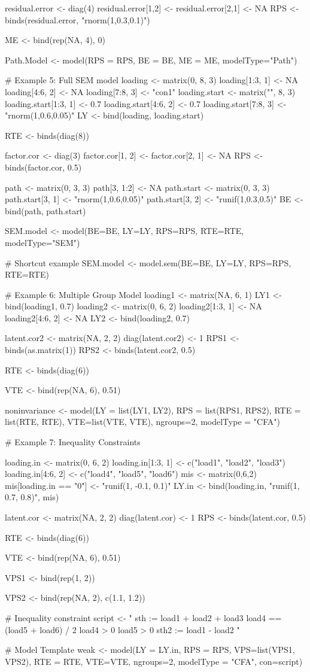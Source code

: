 \documentclass[a4paper]{book}
\begin{document}
\begin{Examples}
\begin{ExampleCode}
residual.error <- diag(4)
residual.error[1,2] <- residual.error[2,1] <- NA
RPS <- binds(residual.error, "rnorm(1,0.3,0.1)")

ME <- bind(rep(NA, 4), 0)

Path.Model <- model(RPS = RPS, BE = BE, ME = ME, modelType="Path")

# Example 5: Full SEM model 
loading <- matrix(0, 8, 3)
loading[1:3, 1] <- NA
loading[4:6, 2] <- NA
loading[7:8, 3] <- "con1"
loading.start <- matrix("", 8, 3)
loading.start[1:3, 1] <- 0.7
loading.start[4:6, 2] <- 0.7
loading.start[7:8, 3] <- "rnorm(1,0.6,0.05)"
LY <- bind(loading, loading.start)

RTE <- binds(diag(8))

factor.cor <- diag(3)
factor.cor[1, 2] <- factor.cor[2, 1] <- NA
RPS <- binds(factor.cor, 0.5)

path <- matrix(0, 3, 3)
path[3, 1:2] <- NA
path.start <- matrix(0, 3, 3)
path.start[3, 1] <- "rnorm(1,0.6,0.05)"
path.start[3, 2] <- "runif(1,0.3,0.5)"
BE <- bind(path, path.start)

SEM.model <- model(BE=BE, LY=LY, RPS=RPS, RTE=RTE, modelType="SEM")

# Shortcut example
SEM.model <- model.sem(BE=BE, LY=LY, RPS=RPS, RTE=RTE)

# Example 6: Multiple Group Model
loading1 <- matrix(NA, 6, 1)
LY1 <- bind(loading1, 0.7)
loading2 <- matrix(0, 6, 2)
loading2[1:3, 1] <- NA
loading2[4:6, 2] <- NA
LY2 <- bind(loading2, 0.7)

latent.cor2 <- matrix(NA, 2, 2)
diag(latent.cor2) <- 1
RPS1 <- binds(as.matrix(1))
RPS2 <- binds(latent.cor2, 0.5)

RTE <- binds(diag(6))

VTE <- bind(rep(NA, 6), 0.51)

noninvariance <- model(LY = list(LY1, LY2), RPS = list(RPS1, RPS2), RTE = list(RTE, RTE), 
	VTE=list(VTE, VTE), ngroups=2, modelType = "CFA")

# Example 7: Inequality Constraints

loading.in <- matrix(0, 6, 2)
loading.in[1:3, 1] <- c("load1", "load2", "load3")
loading.in[4:6, 2] <- c("load4", "load5", "load6")
mis <- matrix(0,6,2)
mis[loading.in == "0"] <- "runif(1, -0.1, 0.1)"
LY.in <- bind(loading.in, "runif(1, 0.7, 0.8)", mis)

latent.cor <- matrix(NA, 2, 2)
diag(latent.cor) <- 1
RPS <- binds(latent.cor, 0.5)

RTE <- binds(diag(6))

VTE <- bind(rep(NA, 6), 0.51)

VPS1 <- bind(rep(1, 2))

VPS2 <- bind(rep(NA, 2), c(1.1, 1.2))

# Inequality constraint
script <- "
sth := load1 + load2 + load3
load4 == (load5 + load6) / 2
load4 > 0
load5 > 0
sth2 := load1 - load2
"

# Model Template
weak <- model(LY = LY.in, RPS = RPS, VPS=list(VPS1, VPS2), RTE = RTE, VTE=VTE, ngroups=2, 
	modelType = "CFA", con=script)
\end{ExampleCode}
\end{Examples}
\end{document}
